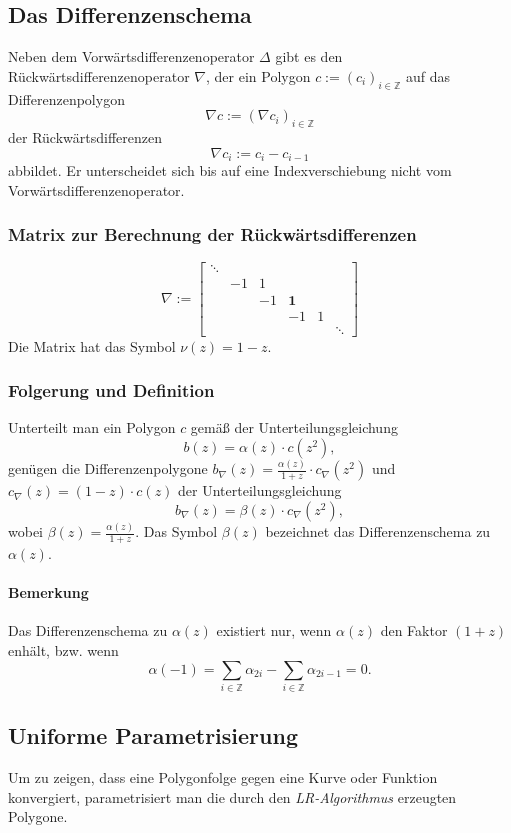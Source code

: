\subsection{Das Differenzenschema}
Neben dem Vorwärtsdifferenzenoperator \(\Delta\) gibt es den Rückwärtsdifferenzenoperator \(\nabla\), der ein Polygon \(c:=(c_i)_{i \in \mathbb{Z}}\) auf das Differenzenpolygon
\[\nabla c := (\nabla c_i)_{i \in \mathbb{Z}}\]
der Rückwärtsdifferenzen
\[\nabla c_i := c_i - c_{i-1}\]
abbildet. Er unterscheidet sich bis auf eine Indexverschiebung nicht vom Vorwärtsdifferenzenoperator.

\subsubsection{Matrix zur Berechnung der Rückwärtsdifferenzen}
\[\nabla :=
	\begin{bmatrix}
		\ddots 	& 		& 		&				&		&			\\
				& -1 	& 1		& 				&		&			\\
				& 	 	& -1	& \textbf{1} 	&		&			\\
				&		&		& -1 			& 1		&			\\
				&		&		&				&		& \ddots
	\end{bmatrix}
\]
Die Matrix hat das Symbol \(\nu(z) = 1-z\).

\subsubsection{Folgerung und Definition}
Unterteilt man ein Polygon \(c\) gemäß der Unterteilungsgleichung
\[b(z) = \alpha(z) \cdot c(z^2),\]
genügen die Differenzenpolygone \(b_{\nabla}(z) = \frac{\alpha(z)}{1+z} \cdot c_{\nabla}(z^2)\) und \(c_{\nabla}(z) = (1-z)\cdot c(z)\) der Unterteilungsgleichung
\[b_{\nabla}(z) = \beta(z) \cdot c_{\nabla}(z^2),\]
wobei \(\beta(z) = \frac{\alpha(z)}{1+z}\). Das Symbol \(\beta(z)\) bezeichnet das Differenzenschema zu \(\alpha(z)\).

\paragraph{Bemerkung}
Das Differenzenschema zu \(\alpha(z)\) existiert nur, wenn \(\alpha(z)\) den Faktor \((1+z)\) enhält, bzw. wenn
\[\alpha(-1) = \sum_{i \in \mathbb{Z}} \alpha_{2i} - \sum_{i \in \mathbb{Z}} \alpha_{2i-1} = 0.\]


\subsection{Uniforme Parametrisierung}
Um zu zeigen, dass eine Polygonfolge gegen eine Kurve oder Funktion konvergiert, parametrisiert man die durch den \textit{LR-Algorithmus} erzeugten Polygone.

